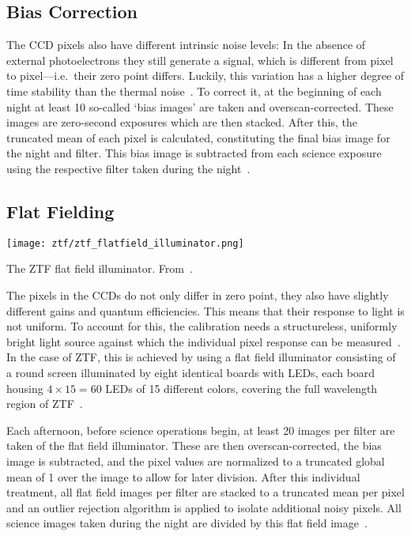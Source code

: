 \subsection{Bias Correction}
The CCD pixels also have different intrinsic noise levels: In the absence of external photoelectrons they still generate a signal, which is different from pixel to pixel---i.e.\ their zero point differs. Luckily, this variation has a higher degree of time stability than the thermal noise~. To correct it, at the beginning of each night at least 10 so-called `bias images' are taken and overscan-corrected. These images are zero-second exposures which are then stacked. After this, the truncated mean of each pixel is calculated, constituting the final bias image for the night and filter. This bias image is subtracted from each science exposure using the respective filter taken during the night~\cite{Masci2019a}.

\subsection{Flat Fielding}

\begin{marginfigure}
    \texttt{[image: ztf/ztf\_flatfield\_illuminator.png]}
    \caption[ZTF flat field illuminator]{The ZTF flat field illuminator. From~\cite{Dekany2020}.}
\end{marginfigure}

The pixels in the CCDs do not only differ in zero point, they also have slightly different gains and quantum efficiencies. This means that their response to light is not uniform. To account for this, the calibration needs a structureless, uniformly bright light source against which the individual pixel response can be measured~\cite{Howell2006}. In the case of ZTF, this is achieved by using a flat field illuminator consisting of a round screen illuminated by eight identical boards with LEDs, each board housing $4\times15=60$ LEDs of 15 different colors, covering the full wavelength region of ZTF~\cite{Dekany2020}.

Each afternoon, before science operations begin, at least 20 images per filter are taken of the flat field illuminator. These are then overscan-corrected, the bias image is subtracted, and the pixel values are normalized to a truncated global mean of 1 over the image to allow for later division. After this individual treatment, all flat field images per filter are stacked to a truncated mean per pixel and an outlier rejection algorithm is applied to isolate additional noisy pixels. All science images taken during the night are divided by this flat field image~\cite{Masci2019a}.

